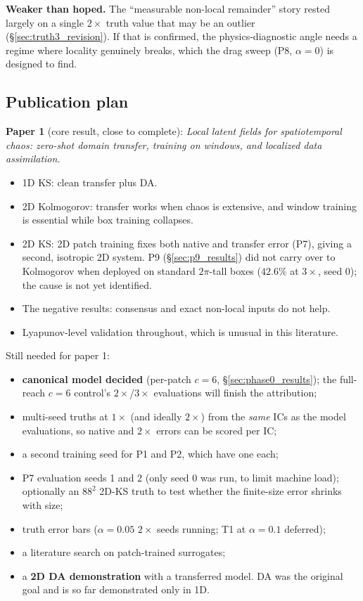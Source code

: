 \documentclass[11pt]{article}
\begin{document}
\textbf{Weaker than hoped.} The ``measurable non-local remainder'' story
rested largely on a single $2\times$ truth value that may be an outlier
(\S\ref{sec:truth3_revision}). If that is confirmed, the
physics-diagnostic angle needs a regime where locality genuinely breaks,
which the drag sweep (P8, $\alpha{=}0$) is designed to find.

\subsection{Publication plan}
\textbf{Paper 1} (core result, close to complete):
\emph{Local latent fields for spatiotemporal chaos: zero-shot domain
transfer, training on windows, and localized data assimilation.}
\begin{itemize}[leftmargin=*]
\item 1D KS: clean transfer plus DA.
\item 2D Kolmogorov: transfer works when chaos is extensive, and window
  training is essential while box training collapses.
\item 2D KS: 2D patch training fixes both native and transfer error
  (P7), giving a second, isotropic 2D system. P9 (\S\ref{sec:p9_results})
  did not carry over to Kolmogorov when deployed on standard $2\pi$-tall
  boxes ($42.6\%$ at $3\times$, seed 0); the cause is not yet
  identified.
\item The negative results: consensus and exact non-local inputs do not
  help.
\item Lyapunov-level validation throughout, which is unusual in this
  literature.
\end{itemize}
Still needed for paper 1:
\begin{itemize}[leftmargin=*]
\item \textbf{canonical model decided} (per-patch $c{=}6$,
  \S\ref{sec:phase0_results}); the full-reach $c{=}6$ control's
  $2\times$/$3\times$ evaluations will finish the attribution;
\item multi-seed truths at $1\times$ (and ideally $2\times$) from the
  \emph{same} ICs as the model evaluations, so native and $2\times$ errors
  can be scored per IC;
\item a second training seed for P1 and P2, which have one each;
\item P7 evaluation seeds 1 and 2 (only seed 0 was run, to limit machine
  load); optionally an $88^2$ 2D-KS truth to test whether the
  finite-size error shrinks with size;
\item truth error bars ($\alpha{=}0.05$ $2\times$ seeds running; T1 at
  $\alpha{=}0.1$ deferred);
\item a literature search on patch-trained surrogates;
\item a \textbf{2D DA demonstration} with a transferred model. DA was the
  original goal and is so far demonstrated only in 1D.
\end{itemize}
\end{document}
